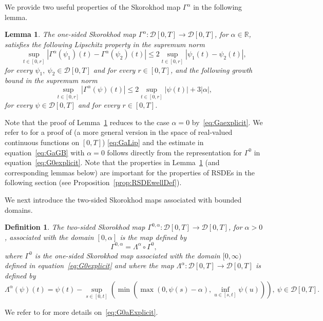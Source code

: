 \documentclass[11pt]{amsart}
\newtheorem{lemma}[theorem]{Lemma}
\newtheorem{defi}[theorem]{Definition}
\begin{document}
{We provide two useful properties of the Skorokhod map $\Gamma^{\alpha}$ in the following lemma.
\begin{lemma}\label{lem:GaLipGB}
The one-sided Skorokhod map $\Gamma^{\alpha}: \mathcal{D}[0,T] \to \mathcal{D}[0,T]$, for $\alpha \in \mathbb{R}$, satisfies the following Lipschitz property in the supremum norm
\begin{equation}\label{eq:GaLip}
\sup_{t \in [0,r]} |\Gamma^{\alpha}(\psi_{1})(t)-\Gamma^{\alpha}(\psi_{2})(t)| \leq 2 \sup_{t \in [0,r]} |\psi_{1}(t)-\psi_{2}(t)|,
\end{equation}
for every $\psi_{1},\ \psi_{2} \in \mathcal{D}[0,T]$ and for every $r \in [0,T]$, and the following growth bound in the supremum norm
\begin{equation}\label{eq:GaGB}
\sup_{t \in [0,r]} |\Gamma^{\alpha}(\psi)(t)| \leq 2 \sup_{t \in [0,r]} |\psi(t)| + 3 |\alpha|,
\end{equation}
for every $\psi \in \mathcal{D}[0,T]$ and for every $r \in [0,T]$.
\end{lemma}
Note that the proof of Lemma~\ref{lem:GaLipGB} reduces to the case $\alpha = 0$ by~\eqref{eq:Gaexplicit}. We refer to \cite{MR1110990} for a proof of (a more general version in the space of real-valued continuous functions on $[0,T]$) \eqref{eq:GaLip} and the estimate in equation~\eqref{eq:GaGB} with $\alpha=0$ follows directly from the representation for $\Gamma^{0}$ in equation~\eqref{eq:G0explicit}. Note that the properties in Lemma~\ref{lem:GaLipGB} (and corresponding lemmas below) are important for the properties of RSDEs in the following section (see Proposition~\ref{prop:RSDEwellDef}).

We next introduce the two-sided Skorokhod maps associated with bounded domains.
\begin{defi}\label{def:G0aExplicit}
The two-sided Skorokhod map $\Gamma^{0,\alpha} : \mathcal{D}[0,T] \to \mathcal{D}[0,T]$, for $\alpha>0$, associated with the domain $[0,\alpha]$ is the map defined by
\begin{equation}\label{eq:G0aExplicit}
\Gamma^{0,\alpha} = \Lambda^{\alpha} \circ \Gamma^{0},
\end{equation}
where $\Gamma^{0}$ is the one-sided Skorokhod map associated with the domain $[0,\infty)$ defined in equation~\eqref{eq:G0explicit} and where the map $\Lambda^{\alpha}: \mathcal{D}[0,T] \to \mathcal{D}[0,T]$ is defined by
\begin{equation*}
\Lambda^{\alpha}(\psi)(t) = \psi(t) - \sup_{s \in [0,t]} \left( \min \left( \max(0,\psi(s)-\alpha) , \inf_{u \in [s,t]} \psi(u) \right) \right),\ \psi \in \mathcal{D}[0,T]. 
\end{equation*}
\end{defi}
We refer to \cite{MR2349573} for more details on~\eqref{eq:G0aExplicit}.

}
\end{document}
